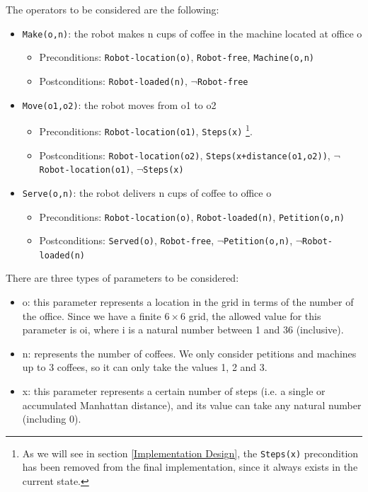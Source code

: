 \documentclass[12pt,a4paper,oneside]{article}
\numberwithin{equation}{section}
\numberwithin{equation}{section}
\theoremstyle{definition}
\begin{document}
The operators to be considered are the following:
\begin{itemize}
	\item \texttt{Make(o,n)}: the robot makes n cups of coffee in the machine located at office o
	\begin{itemize}
		\item Preconditions: \texttt{Robot-location(o)}, \texttt{Robot-free}, \texttt{Machine(o,n)}
		\item Postconditions: \texttt{Robot-loaded(n)}, $\neg$\texttt{Robot-free}
	\end{itemize}
	\item \texttt{Move(o1,o2)}: the robot moves from o1 to o2
	\begin{itemize}
		\item Preconditions: \texttt{Robot-location(o1)}, \texttt{Steps(x)} \footnote{As we will see in section \ref{Implementation Design}, the \texttt{Steps(x)} precondition has been removed from the final implementation, since it always exists in the current state.}.
		\item Postconditions: \texttt{Robot-location(o2)}, \texttt{Steps(x+distance(o1,o2))}, $\neg$\texttt{Robot-location(o1)}, $\neg$\texttt{Steps(x)}
	\end{itemize}
	\item \texttt{Serve(o,n)}: the robot delivers n cups of coffee to office o
	\begin{itemize}
		\item Preconditions: \texttt{Robot-location(o)}, \texttt{Robot-loaded(n)}, \texttt{Petition(o,n)}
		\item Postconditions: \texttt{Served(o)}, \texttt{Robot-free}, $\neg$\texttt{Petition(o,n)}, $\neg$\texttt{Robot-loaded(n)}
	\end{itemize}
\end{itemize}

There are three types of parameters to be considered:
\begin{itemize}
	\item o: this parameter represents a location in the grid in terms of the number of the office. Since we have a finite $6 \times 6$ grid, the allowed value for this parameter is oi, where i is a natural number between 1 and 36 (inclusive).
	\item n: represents the number of coffees. We only consider petitions and machines up to 3 coffees, so it can only take the values 1, 2 and 3.
	\item x: this parameter represents a certain number of steps (i.e. a single or accumulated Manhattan distance), and its value can take any natural number (including 0). 
\end{itemize}
\end{document}
